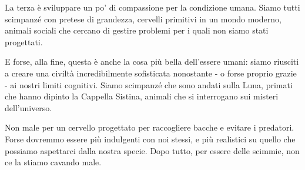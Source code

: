La terza è sviluppare un po' di compassione per la condizione umana. Siamo tutti scimpanzé con pretese di grandezza, cervelli primitivi in un mondo moderno, animali sociali che cercano di gestire problemi per i quali non siamo stati progettati.

E forse, alla fine, questa è anche la cosa più bella dell'essere umani: siamo riusciti a creare una civiltà incredibilmente sofisticata nonostante - o forse proprio grazie - ai nostri limiti cognitivi. Siamo scimpanzé che sono andati sulla Luna, primati che hanno dipinto la Cappella Sistina, animali che si interrogano sui misteri dell'universo.

Non male per un cervello progettato per raccogliere bacche e evitare i predatori. Forse dovremmo essere più indulgenti con noi stessi, e più realistici su quello che possiamo aspettarci dalla nostra specie. Dopo tutto, per essere delle scimmie, non ce la stiamo cavando male.